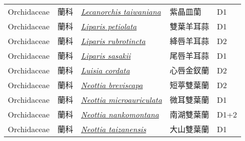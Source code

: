 {\begin{longtable}{L{2.5cm}L{2cm}L{5cm}L{2.5cm}L{3cm}}
    Orchidaceae & 蘭科 & \href{http://www.theplantlist.org/tpl1.1/search?q=Lecanorchis+taiwaniana}{\textit{Lecanorchis taiwaniana} } & 紫晶皿蘭 & D1    \\
    Orchidaceae & 蘭科 & \href{http://www.theplantlist.org/tpl1.1/search?q=Liparis+petiolata}{\textit{Liparis petiolata} } & 雙葉羊耳蒜 & D1    \\
    Orchidaceae & 蘭科 & \href{http://www.theplantlist.org/tpl1.1/search?q=Liparis+rubrotincta}{\textit{Liparis rubrotincta} } & 絳唇羊耳蒜 & D2    \\
    Orchidaceae & 蘭科 & \href{http://www.theplantlist.org/tpl1.1/search?q=Liparis+sasakii}{\textit{Liparis sasakii} } & 尾唇羊耳蒜 & D1    \\
    Orchidaceae & 蘭科 & \href{http://www.theplantlist.org/tpl1.1/search?q=Luisia+cordata}{\textit{Luisia cordata} } & 心唇金釵蘭 & D2    \\
    Orchidaceae & 蘭科 & \href{http://www.theplantlist.org/tpl1.1/search?q=Neottia+breviscapa}{\textit{Neottia breviscapa} } & 短葶雙葉蘭 & D2    \\
    Orchidaceae & 蘭科 & \href{http://www.theplantlist.org/tpl1.1/search?q=Neottia+microauriculata}{\textit{Neottia microauriculata} } & 微耳雙葉蘭 & D1    \\
    Orchidaceae & 蘭科 & \href{http://www.theplantlist.org/tpl1.1/search?q=Neottia+nankomontana}{\textit{Neottia nankomontana} } & 南湖雙葉蘭 & D1+2    \\
    Orchidaceae & 蘭科 & \href{http://www.theplantlist.org/tpl1.1/search?q=Neottia+taizanensis}{\textit{Neottia taizanensis} } & 大山雙葉蘭 & D1    \\

\end{longtable}}
